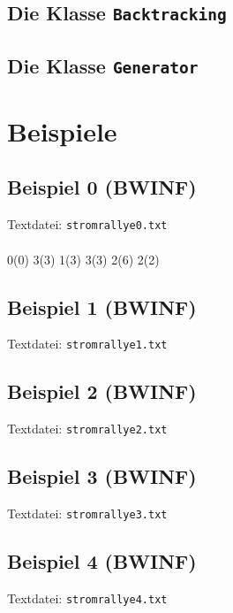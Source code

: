 \documentclass[a4paper,10pt,ngerman]{scrartcl}
\begin{document}
\subsection{Die Klasse \texttt{Backtracking}}

\subsection{Die Klasse \texttt{Generator}}

\newpage
\section{Beispiele}

\subsection{Beispiel 0 (BWINF)}
Textdatei: \texttt{stromrallye0.txt}\\

\\

0(0) 3(3) 1(3) 3(3) 2(6) 2(2) 

\subsection{Beispiel 1 (BWINF)}\label{example:1}
Textdatei: \texttt{stromrallye1.txt}\\

\subsection{Beispiel 2 (BWINF)}
Textdatei: \texttt{stromrallye2.txt}\\

\subsection{Beispiel 3 (BWINF)}
Textdatei: \texttt{stromrallye3.txt}\\


\subsection{Beispiel 4 (BWINF)}
Textdatei: \texttt{stromrallye4.txt}\\

\\
\end{document}
